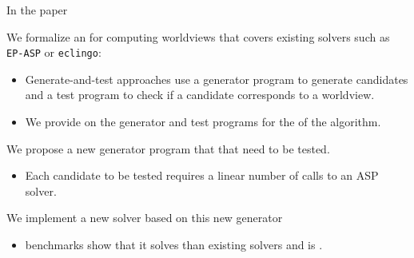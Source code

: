\documentclass[aspectratio=169,svgnames,xcolor=table,t]{beamer}
\begin{document}
\begin{frame}{In the paper}
    \begin{myitemize}
        \item We formalize an  for computing worldviews that covers existing solvers such as \texttt{EP-ASP} or \texttt{eclingo}:
        \begin{itemize}
            \item Generate-and-test approaches use a generator program to generate candidates and a test program to check if a candidate corresponds to a worldview.

            \item We provide  on the generator and test programs for the  of the algorithm.
        \end{itemize}
        
        \medskip

        \item We propose a new generator program that  that need to be tested.
        \begin{itemize}
            \item Each candidate to be tested requires a linear number of calls to an ASP solver.
        \end{itemize}

        \medskip

        \item We implement a new solver based on this new generator
        \begin{itemize}
            \item benchmarks show that it solves  than existing solvers and is .
        \end{itemize}
    \end{myitemize}
    \end{frame}
\end{document}
